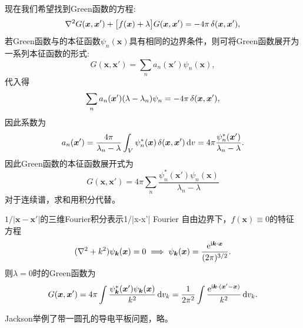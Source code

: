 现在我们希望找到Green函数的方程:
\begin{equation}
    \nabla^2 G(\bm x,\bm x')+\bigl[f(\bm x)+\lambda\bigr]G(\bm x,\bm x')=-4\pi\mathop{}\!\delta(\bm x,\bm x'),
\end{equation}
若Green函数与的本征函数$\psi_n(\bm x)$具有相同的边界条件，则可将Green函数展开为一系列本征函数的形式:
\[
    G(\bm x,\bm x')=\sum_n a_n(\bm x')\psi_n(\bm x),
\]
代入得
\[
    \sum_n a_n(\bm x')(\lambda-\lambda_n)\psi_n=-4\pi\mathop{}\!\delta(\bm x,\bm x'),
\]
因此系数为
\[
    a_n(\bm x')=\frac{4\pi}{\lambda_n-\lambda}\int_V\psi^\ast_n(\bm x)\mathop{}\!\delta(\bm x,\bm x')\mathop{}\!\mathrm{d} v=4\pi\frac{\psi_n^\ast(\bm x')}{\lambda_n-\lambda}.
\]
因此Green函数的本征函数展开式为
\begin{equation}
    G(\bm x,\bm x')=4\pi\sum_n \frac{\psi_n^\ast(\bm x')\psi_n(\bm x)}{\lambda_n-\lambda}
\end{equation}
对于连续谱，求和用积分代替。
\begin{example}{$1/|\bm x-\bm x'|$的三维Fourier积分表示}{1/|x-x'| Fourier}
    自由边界下，$f(\bm x)\equiv 0$的特征方程
    \[
        (\nabla^2+k^2)\psi_{\bm k}(\bm x)=0\implies\psi_{\bm k}(\bm x)=\frac{\mathop{}\!\mathrm{e}^{\mathrm{i}\bm k\cdot\bm x}}{(2\pi)^{3/2}}.
    \]
    则$\lambda=0$时的Green函数为
    \[
        G(\bm x,\bm x')=4\pi\int\frac{\psi_{\bm k}^\ast(\bm x')\psi_{\bm k}(\bm x)}{k^2}\mathop{}\!\mathrm{d} v_k=\frac1{2\pi^2}\int\frac{\mathop{}\!\mathrm{e}^{\mathrm{i}\bm k\cdot(\bm x'-\bm x)}}{k^2}\mathop{}\!\mathrm{d} v_k.
    \]
\end{example}

\label{sec:mixed boundary condition}

Jackson举例了带一圆孔的导电平板问题，略。

